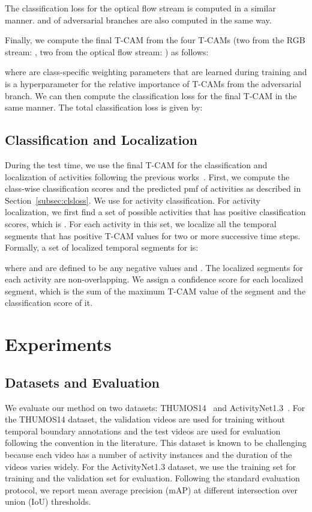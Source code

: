 \documentclass[runningheads]{llncs}
\newcommand{\tcam}{\mbox{T-CAM}}
\newcommand{\thumos}{\mbox{THUMOS14}}
\newcommand{\actthree}{\mbox{ActivityNet1.3}}
\begin{document}
The classification loss for the optical flow stream  is computed in a similar manner.  and  of adversarial branches are also computed in the same way.

Finally, we compute the final \tcam{}  from the four \tcam{}s (two from the RGB stream: , two from the optical flow stream: ) as follows:

where  are class-specific weighting parameters that are learned during training and  is a hyperparameter for the relative importance of \tcam{}s from the adversarial branch. We can then compute the classification loss for the final \tcam{}  in the same manner. The total classification loss is given by:


\subsection{Classification and Localization}
During the test time, we use the final \tcam{}  for the classification and localization of activities following the previous works~\cite{paul2018w,narayan20193c}. First, we compute the class-wise classification scores  and the predicted pmf of activities  as described in Section~\ref{subsec:clsloss}. We use  for activity classification. For activity localization, we first find a set of possible activities that has positive classification scores, which is . For each activity in this set, we localize all the temporal segments that has positive \tcam{} values for two or more successive time steps. Formally, a set of localized temporal segments for  is:

where  and  are defined to be any negative values and . The localized segments for each activity are non-overlapping. We assign a confidence score for each localized segment, which is the sum of the maximum \tcam{} value of the segment and the classification score of it.

\section{Experiments}
\subsection{Datasets and Evaluation}
We evaluate our method on two datasets: \thumos{}~\cite{THUMOS14} and \actthree{}~\cite{caba2015activitynet}. For the \thumos{} dataset, the validation videos are used for training without temporal boundary annotations and the test videos are used for evaluation following the convention in the literature. This dataset is known to be challenging because each video has a number of activity instances and the duration of the videos varies widely. For the \actthree{} dataset, we use the training set for training and the validation set for evaluation.
Following the standard evaluation protocol, we report mean average precision (mAP) at different intersection over union (IoU) thresholds.
\end{document}
